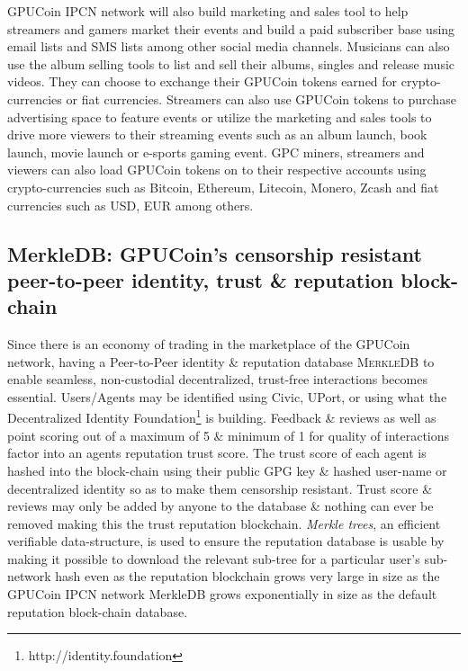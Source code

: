 \documentclass{article}
\begin{document}
 GPUCoin IPCN network will also build marketing and sales tool to help streamers and gamers market their events and build a paid subscriber base using email lists and SMS lists among other social media channels. 
Musicians can also use the album selling tools to list and sell their albums, singles and release music videos. They can choose to exchange their GPUCoin tokens earned for crypto-currencies or fiat currencies.
 Streamers can also use GPUCoin tokens to purchase advertising space to feature events or utilize the marketing and sales tools to drive more viewers to their streaming events such as an album launch, book launch, movie launch or e-sports gaming event. GPC miners, streamers and viewers can also load GPUCoin tokens on to their respective accounts using crypto-currencies such as Bitcoin, Ethereum, Litecoin, Monero, Zcash and fiat currencies such as USD, EUR among others.


\subsection{MerkleDB: GPUCoin's censorship resistant peer-to-peer identity, trust \& reputation block-chain}
Since there is an economy of trading in the marketplace of the GPUCoin network, having a Peer-to-Peer identity \& reputation database \textsc{MerkleDB} to enable seamless, non-custodial decentralized, trust-free interactions becomes essential. Users/Agents may be identified using Civic, UPort, or using what the Decentralized Identity Foundation\footnote{http://identity.foundation} is building. Feedback \& reviews as well as point scoring out of a maximum of 5 \& minimum of 1 for quality of interactions factor into an agents reputation trust score. The trust score of each agent is hashed into the block-chain using their public GPG key \& hashed user-name or decentralized identity so as to make them censorship resistant. Trust score \& reviews may only be added by anyone to the database \& nothing can ever be removed making this the trust reputation blockchain. \emph{Merkle trees}, an efficient verifiable data-structure, is used to ensure the reputation database is usable by making it possible to download the relevant sub-tree for a particular user's sub-network hash even as the reputation blockchain grows very large in size as the GPUCoin IPCN network MerkleDB grows exponentially in size as the default reputation block-chain database.

\end{document}
